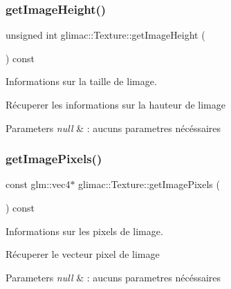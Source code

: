 \subsubsection{\texorpdfstring{get\+Image\+Height()}{getImageHeight()}}
{\footnotesize\ttfamily unsigned int glimac\+::\+Texture\+::get\+Image\+Height (\begin{DoxyParamCaption}{ }\end{DoxyParamCaption}) const\hspace{0.3cm}{\ttfamily [inline]}}



Informations sur la taille de l\textquotesingle{}image. 

Récuperer les informations sur la hauteur de l\textquotesingle{}image


\begin{DoxyParams}{Parameters}
{\em null} & \+: aucuns parametres nécéssaires \\
\hline
\end{DoxyParams}
\mbox{\label{classglimac_1_1Texture_a7060818013d2bfbe42df5d0b01f2825d}} 
\subsubsection{\texorpdfstring{get\+Image\+Pixels()}{getImagePixels()}}
{\footnotesize\ttfamily const glm\+::vec4$\ast$ glimac\+::\+Texture\+::get\+Image\+Pixels (\begin{DoxyParamCaption}{ }\end{DoxyParamCaption}) const\hspace{0.3cm}{\ttfamily [inline]}}



Informations sur les pixels de l\textquotesingle{}image. 

Récuperer le vecteur pixel de l\textquotesingle{}image


\begin{DoxyParams}{Parameters}
{\em null} & \+: aucuns parametres nécéssaires \\
\hline
\end{DoxyParams}
\mbox{\label{classglimac_1_1Texture_a68dac46277c6e48989bc2be07ebc2fec}} 
